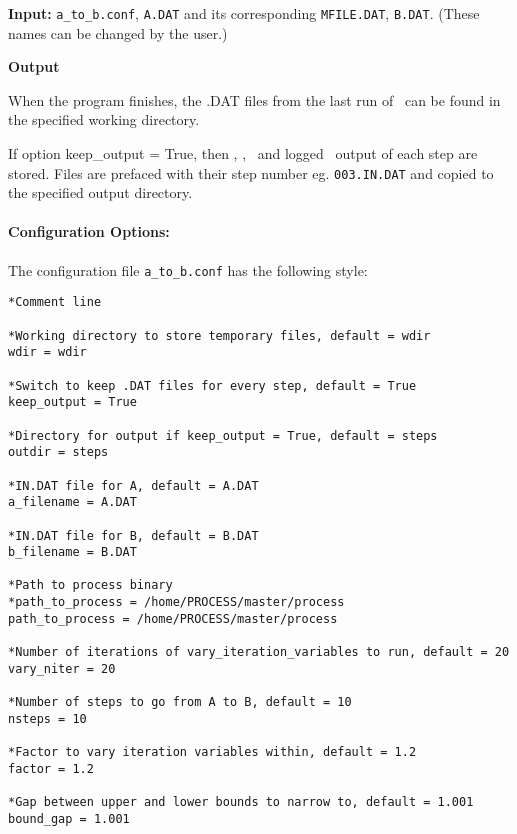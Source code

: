 \begin{description}
\item{\textbf{Input:}}
\texttt{a\_to\_b.conf}, \texttt{A.DAT} and its corresponding \texttt{MFILE.DAT}, \texttt{B.DAT}.
(These names can be changed by the user.)

\item{\textbf{Output}} 

When the program finishes, the .DAT files from the last run of \process\ can
be found in the specified working directory.

If option keep\_output = True, then \indat, \outdat, \mfile\ and logged \process\
output of each step are stored. Files are prefaced with their step number
eg. \texttt{003.IN.DAT} and copied to the specified output directory.

\end{description}

\paragraph{Configuration Options:}

The configuration file \texttt{a\_to\_b.conf} has the following style:
\begin{framed}
\begin{verbatim}
*Comment line

*Working directory to store temporary files, default = wdir
wdir = wdir

*Switch to keep .DAT files for every step, default = True
keep_output = True

*Directory for output if keep_output = True, default = steps
outdir = steps

*IN.DAT file for A, default = A.DAT
a_filename = A.DAT

*IN.DAT file for B, default = B.DAT
b_filename = B.DAT

*Path to process binary
*path_to_process = /home/PROCESS/master/process
path_to_process = /home/PROCESS/master/process

*Number of iterations of vary_iteration_variables to run, default = 20
vary_niter = 20

*Number of steps to go from A to B, default = 10
nsteps = 10

*Factor to vary iteration variables within, default = 1.2
factor = 1.2

*Gap between upper and lower bounds to narrow to, default = 1.001
bound_gap = 1.001
\end{verbatim}
\end{framed}

